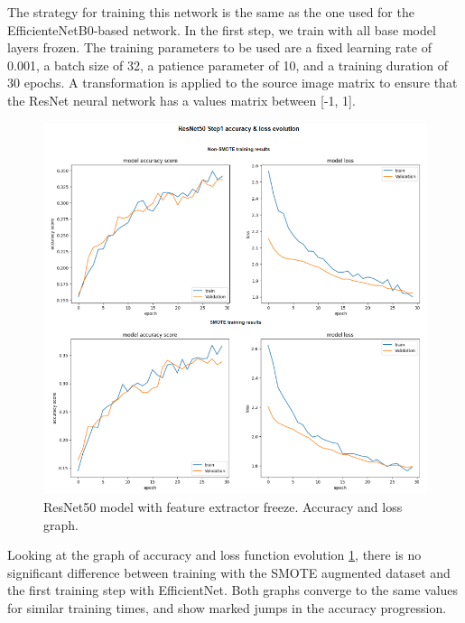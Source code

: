 The strategy for training this network is the same as the one used for the EfficienteNetB0-based network. In the first step, we train with all base model layers frozen.  The training parameters to be used are a fixed learning rate of 0.001, a batch size of 32, a patience parameter of 10, and a training duration of 30 epochs. A transformation is applied to the source image matrix to ensure that the ResNet neural network has a values matrix between [-1, 1].  

\begin{figure}[ht]
    \begin{center}
        \includegraphics[scale=0.5]{images/Building/Model RestNet50/model_RNet_1_model accuray-loss.png}
        \caption{ResNet50 model with feature extractor freeze. Accuracy and loss graph.}
    \label{fig: ResNet50_1_accuracy_loss}    
    \end{center}
\end{figure}

Looking at the graph of accuracy and loss function evolution \ref{fig: ResNet50_1_accuracy_loss}, there is no significant difference between training with the SMOTE augmented dataset and the first training step with EfficientNet. Both graphs converge to the same values for similar training times, and show marked jumps in the accuracy progression. 


